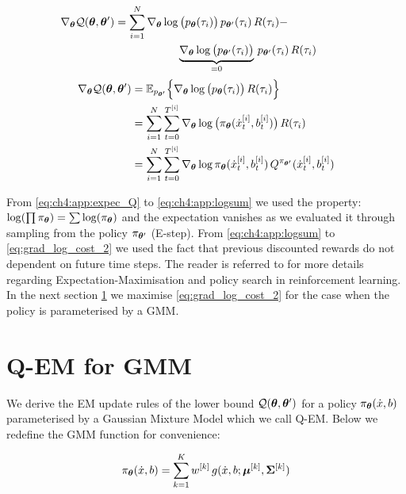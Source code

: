 \begin{appendices}
\begin{align}
 \nabla_{\boldsymbol{\theta}}\mathcal{Q}(\boldsymbol{\theta},\boldsymbol{\theta}')& = \sum\limits_{i=1}^{N} \nabla_{\boldsymbol{\theta}} \log\big( p_{\boldsymbol{\theta}}(\tau_i)\big) \, p_{\boldsymbol{\theta}'}(\tau_i) \, R(\tau_i) - \hspace*{2cm} \nonumber \\
				    &\hspace*{2cm}\underbrace{\nabla_{\boldsymbol{\theta}} \log\big( p_{\boldsymbol{\theta}'}(\tau_i)\big)}_{=0} \, p_{\boldsymbol{\theta}'}(\tau_i) \, R(\tau_i)				   
\end{align}
\begin{align}
 \nabla_{\boldsymbol{\theta}}\mathcal{Q}(\boldsymbol{\theta},\boldsymbol{\theta}') &= \mathbb{E}_{p_{\boldsymbol{\theta}'}} \Big\{ \nabla_{\boldsymbol{\theta}} \log\big( p_{\boldsymbol{\theta}}(\tau_i)\big)\, R(\tau_i) \Big\} \label{eq:ch4:app:expec_Q}\\
					    &= \sum\limits_{i=1}^{N} \sum\limits_{t=0}^{T^{[i]}} \nabla_{\boldsymbol{\theta}} \log\big( \pi_{\boldsymbol{\theta}}(\dot{x}^{[i]}_t,b^{[i]}_t)\big) \, R(\tau_i) \label{eq:ch4:app:logsum} \\
					    &= \sum\limits_{i=1}^{N} \sum\limits_{t=0}^{T^{[i]}} \nabla_{\boldsymbol{\theta}}\log \pi_{\boldsymbol{\theta}}(\dot{x}^{[i]}_t,b^{[i]}_t) \, Q^{\pi_{\boldsymbol{\theta}'}}(\dot{x}^{[i]}_t,b^{[i]}_t) \label{eq:grad_log_cost_2}
\end{align}

From \ref{eq:ch4:app:expec_Q} to \ref{eq:ch4:app:logsum} we used the property: $\log( \prod \pi_{\boldsymbol{\theta}} ) = \sum \log(\pi_{\boldsymbol{\theta}})$ and 
the expectation vanishes as we evaluated it through sampling from the policy $\pi_{\boldsymbol{\theta}'}$ (E-step). From \ref{eq:ch4:app:logsum} to \ref{eq:grad_log_cost_2} 
we used the fact that previous discounted rewards do not dependent on future time steps. The reader is referred 
to \cite[p. 50]{rl_gradient_survey_2013} for more details regarding Expectation-Maximisation and policy search in reinforcement learning.
In the next section \ref{app:grad} we maximise \ref{eq:grad_log_cost_2} for the case when the policy is parameterised by a GMM.


\section{Q-EM for GMM}\label{app:grad}

We derive the EM update rules of the lower bound $\mathcal{Q}(\boldsymbol{\theta},\boldsymbol{\theta}')$ 
for a policy $\pi_{\boldsymbol{\theta}}(\dot{x},b)$ parameterised by a Gaussian Mixture Model which we call 
Q-EM. Below we redefine the GMM function for convenience:

\begin{equation} \label{eq:ch5:app:gmm}
  \pi_{\boldsymbol{\theta}}(\dot{x},b) = \sum\limits_{k=1}^K  w^{[k]}\,g(\dot{x},b;\boldsymbol{\mu}^{[k]},\boldsymbol{\Sigma}^{[k]})
\end{equation}


\end{appendices}
